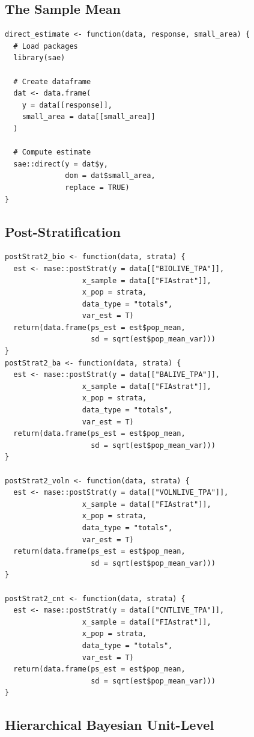 \documentclass[12pt,twoside]{reedthesis}
\begin{document}
\hypertarget{the-sample-mean}{%
\subsection{The Sample Mean}\label{the-sample-mean}}
\begin{verbatim}
direct_estimate <- function(data, response, small_area) {
  # Load packages
  library(sae)
  
  # Create dataframe
  dat <- data.frame(
    y = data[[response]],
    small_area = data[[small_area]]
  )
  
  # Compute estimate
  sae::direct(y = dat$y,
              dom = dat$small_area,
              replace = TRUE)
}
\end{verbatim}
\hypertarget{post-stratification}{%
\subsection{Post-Stratification}\label{post-stratification}}
\begin{verbatim}
postStrat2_bio <- function(data, strata) {
  est <- mase::postStrat(y = data[["BIOLIVE_TPA"]],
                  x_sample = data[["FIAstrat"]],
                  x_pop = strata,
                  data_type = "totals",
                  var_est = T)
  return(data.frame(ps_est = est$pop_mean,
                    sd = sqrt(est$pop_mean_var)))
}
postStrat2_ba <- function(data, strata) {
  est <- mase::postStrat(y = data[["BALIVE_TPA"]],
                  x_sample = data[["FIAstrat"]],
                  x_pop = strata,
                  data_type = "totals",
                  var_est = T)
  return(data.frame(ps_est = est$pop_mean,
                    sd = sqrt(est$pop_mean_var)))
}

postStrat2_voln <- function(data, strata) {
  est <- mase::postStrat(y = data[["VOLNLIVE_TPA"]],
                  x_sample = data[["FIAstrat"]],
                  x_pop = strata,
                  data_type = "totals",
                  var_est = T)
  return(data.frame(ps_est = est$pop_mean,
                    sd = sqrt(est$pop_mean_var)))
}

postStrat2_cnt <- function(data, strata) {
  est <- mase::postStrat(y = data[["CNTLIVE_TPA"]],
                  x_sample = data[["FIAstrat"]],
                  x_pop = strata,
                  data_type = "totals",
                  var_est = T)
  return(data.frame(ps_est = est$pop_mean,
                    sd = sqrt(est$pop_mean_var)))
}
\end{verbatim}
\hypertarget{hierarchical-bayesian-unit-level}{%
\subsection{Hierarchical Bayesian Unit-Level}\label{hierarchical-bayesian-unit-level}}
\end{document}
